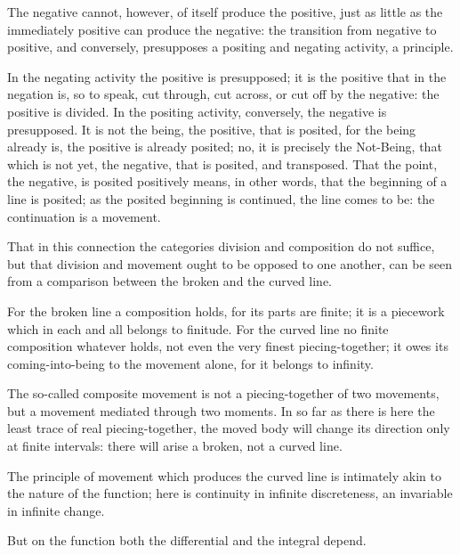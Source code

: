 \documentclass[12pt]{book}
\begin{document}
The negative cannot, however, of itself produce the positive,
just as little as the immediately positive can produce the negative:
the transition from negative to positive, and conversely, presupposes a
positing and negating activity, a principle.

In the negating activity the positive is presupposed; it is the
positive that in the negation is, so to speak, cut through, cut across,
or cut off by the negative: the positive is divided. In the positing
activity, conversely, the negative is presupposed. It is not the
being, the positive, that is posited, for the being already is, the
positive is already posited; no, it is precisely the Not-Being, that which
is not yet, the negative, that is posited, and transposed. That the point, the
negative, is posited positively means, in other words, that the beginning of
a line is posited; as the posited beginning is continued, the line
comes to be: the continuation is a movement.

That in this connection the categories division and
composition do not suffice, but that division and movement ought to be opposed to
one another, can be seen from a comparison between the broken and the curved line.

For the broken line a composition holds, for its parts are
finite; it is a piecework which in each and all belongs to finitude.
For the curved line no finite composition whatever holds,
not even the very finest piecing-together; it owes its coming-into-being to
the movement alone, for it belongs to infinity.

The so-called composite movement is not a piecing-together of two
movements, but a movement mediated through two moments.
In so far as there is here the least trace of real piecing-together, the
moved body will change its direction only at finite intervals: there will
arise a broken, not a curved line.

The principle of movement which produces the curved line is intimately
akin to the nature of the function; here is continuity in infinite
discreteness, an invariable in infinite change.

But on the function both the differential and the integral depend.
\end{document}
